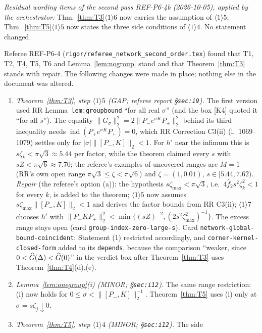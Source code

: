 \documentclass[11pt]{article}
\newcommand{\Pp}{P_+}\newcommand{\Pm}{P_-}\newcommand{\Stwo}{\mathfrak S_2}\newcommand{\Sone}{\mathfrak S_1}
\newcommand{\norm}[1]{\lVert#1\rVert}\newcommand{\abs}[1]{\lvert#1\rvert}\newcommand{\ip}[2]{\langle#1,#2\rangle}
\theoremstyle{definition}\newtheorem{hypothesis}[theorem]{Hypothesis}
\begin{document}
\noindent\emph{Residual wording items of the second pass REF-P6-4b (2026-10-05), applied by the orchestrator:} Thm.~\ref{thm:T3}$\langle1\rangle6$ now carries the assumption of $\langle1\rangle5$; Thm.~\ref{thm:T5}$\langle1\rangle5$ now states the three side conditions of $\langle1\rangle4$. No statement changed.

Referee REF-P6-4 (\texttt{rigor/referee\_network\_second\_order.tex}) found that T1, T2, T4, T5, T6 and
Lemma~\ref{lem:nogroup} stand and that Theorem~\ref{thm:T3} stands with repair.  The following changes were
made in place; nothing else in the document was altered.
\begin{enumerate}[label=(R\arabic*),leftmargin=2.6em]
\item\label{corrR1} \emph{Theorem~\ref{thm:T3}, step $\langle1\rangle5$ (GAP; referee report \S\texttt{sec:i9}).}
 The first version used RR Lemma~\texttt{lem:groupbound} ``for all real $\sigma$'' (and the box [K4] quoted it
 ``for all $s$'').  The equality $\norm{G_\sigma}_2^2=2\norm{\Pm e^{\sigma K}\Pp}_2^2$ behind its third inequality
 needs $\operatorname{ind}(\Pp e^{\sigma K}\Pp)=0$, which RR Correction C3(ii) (l.~1069--1079) settles only for
 $\abs\sigma\norm{[\Pm,K]}_2<1$.  For $h'$ near the infimum this is $s\zeta_k<\pi\sqrt3\approx5.44$ per factor,
 while the theorem claimed every $s$ with $sZ<\pi\sqrt6\approx7.70$; the referee's examples of uncovered ranges
 are $M=1$ (RR's own open range $\pi\sqrt3\le\zeta<\pi\sqrt6$) and $\zeta=(1,0.01)$, $s\in[5.44,7.62)$.
 \emph{Repair} (the referee's option (a)): the hypothesis $s\zeta_{\max}<\pi\sqrt3$, i.e.\
 $4\hat f_2s^2\zeta_k^2<1$ for every $k$, is added to the theorem; $\langle1\rangle5$ now assumes
 $s\zeta_{\max}\norm{[\Pm,K]}_2<1$ and derives the factor bounds from RR C3(ii); $\langle1\rangle7$ chooses $h'$ with
 $\norm{\Pm K\Pp}_2^2<\min\{(sZ)^{-2},(2s^2\zeta_{\max}^2)^{-1}\}$.  The excess range stays open (card
 \texttt{group-index-zero-large-s}).  Card \texttt{network-global-bound-coincident}: Statement (1) restricted
 accordingly, and \texttt{corner-kernel-closed-form} added to its \texttt{depends}, because the comparison
 ``weaker, since $0<\widehat G(\Delta)<\widehat G(0)$'' in the verdict box after Theorem~\ref{thm:T3} uses
 Theorem~\ref{thm:T4}(d),(e).
\item\label{corrR2} \emph{Lemma~\ref{lem:onegroup}(i) (MINOR; \S\texttt{sec:i12}).}  The same range restriction:
 (i) now holds for $0\le\sigma<\norm{[\Pm,K]}_2^{-1}$.  Theorem~\ref{thm:T5} uses (i) only at $\sigma=s\zeta_j\downarrow0$.
\item\label{corrR3} \emph{Theorem~\ref{thm:T5}, step $\langle1\rangle4$ (MINOR; \S\texttt{sec:i12}).}  The side

\end{enumerate}
\end{document}
